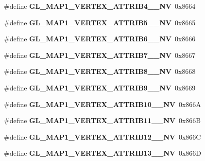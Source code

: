 \begin{DoxyCompactItemize}
\item 
\#define {\bfseries G\+L\+\_\+\+M\+A\+P1\+\_\+\+V\+E\+R\+T\+E\+X\+\_\+\+A\+T\+T\+R\+I\+B4\+\_\+\_\+\+N\+V}~0x8664\label{_s_d_l__opengl_8h_acf8df6fe5fa1f71dfb42b1b793821b26}

\item 
\#define {\bfseries G\+L\+\_\+\+M\+A\+P1\+\_\+\+V\+E\+R\+T\+E\+X\+\_\+\+A\+T\+T\+R\+I\+B5\+\_\+\_\+\+N\+V}~0x8665\label{_s_d_l__opengl_8h_ae139967363da4a568386b34dbf6f47cb}

\item 
\#define {\bfseries G\+L\+\_\+\+M\+A\+P1\+\_\+\+V\+E\+R\+T\+E\+X\+\_\+\+A\+T\+T\+R\+I\+B6\+\_\+\_\+\+N\+V}~0x8666\label{_s_d_l__opengl_8h_ac420ae69bbe481ae1c249889b18fc86e}

\item 
\#define {\bfseries G\+L\+\_\+\+M\+A\+P1\+\_\+\+V\+E\+R\+T\+E\+X\+\_\+\+A\+T\+T\+R\+I\+B7\+\_\+\_\+\+N\+V}~0x8667\label{_s_d_l__opengl_8h_a7ca5ae2e8113e7781a3f28305aead191}

\item 
\#define {\bfseries G\+L\+\_\+\+M\+A\+P1\+\_\+\+V\+E\+R\+T\+E\+X\+\_\+\+A\+T\+T\+R\+I\+B8\+\_\+\_\+\+N\+V}~0x8668\label{_s_d_l__opengl_8h_a3b414212d6fa089193b8f7c7d23c00b5}

\item 
\#define {\bfseries G\+L\+\_\+\+M\+A\+P1\+\_\+\+V\+E\+R\+T\+E\+X\+\_\+\+A\+T\+T\+R\+I\+B9\+\_\+\_\+\+N\+V}~0x8669\label{_s_d_l__opengl_8h_a6bc2e1241dcf64a4cb0c8f46d528f59d}

\item 
\#define {\bfseries G\+L\+\_\+\+M\+A\+P1\+\_\+\+V\+E\+R\+T\+E\+X\+\_\+\+A\+T\+T\+R\+I\+B10\+\_\+\_\+\+N\+V}~0x866\+A\label{_s_d_l__opengl_8h_aa6cadd8e9259c24940458ac74be636e5}

\item 
\#define {\bfseries G\+L\+\_\+\+M\+A\+P1\+\_\+\+V\+E\+R\+T\+E\+X\+\_\+\+A\+T\+T\+R\+I\+B11\+\_\+\_\+\+N\+V}~0x866\+B\label{_s_d_l__opengl_8h_a28fb0a7695ec0ba03a24103d8c00f5e5}

\item 
\#define {\bfseries G\+L\+\_\+\+M\+A\+P1\+\_\+\+V\+E\+R\+T\+E\+X\+\_\+\+A\+T\+T\+R\+I\+B12\+\_\+\_\+\+N\+V}~0x866\+C\label{_s_d_l__opengl_8h_ae34201c834d691412c8ea7b97659b331}

\item 
\#define {\bfseries G\+L\+\_\+\+M\+A\+P1\+\_\+\+V\+E\+R\+T\+E\+X\+\_\+\+A\+T\+T\+R\+I\+B13\+\_\+\_\+\+N\+V}~0x866\+D\label{_s_d_l__opengl_8h_a163f00fdaf297768bd4a92a50c53d782}


\end{DoxyCompactItemize}
